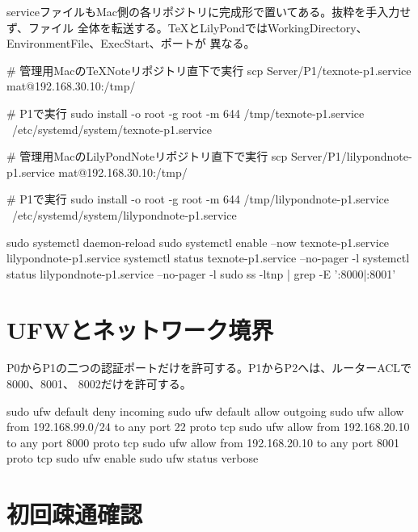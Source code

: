 \documentclass[uplatex,a4paper,11pt]{jsarticle}
\begin{document}
serviceファイルもMac側の各リポジトリに完成形で置いてある。抜粋を手入力せず、ファイル
全体を転送する。TeXとLilyPondではWorkingDirectory、EnvironmentFile、ExecStart、ポートが
異なる。





\begin{command}
# 管理用MacのTeXNoteリポジトリ直下で実行
scp Server/P1/texnote-p1.service mat@192.168.30.10:/tmp/

# P1で実行
sudo install -o root -g root -m 644 /tmp/texnote-p1.service \
  /etc/systemd/system/texnote-p1.service

# 管理用MacのLilyPondNoteリポジトリ直下で実行
scp Server/P1/lilypondnote-p1.service mat@192.168.30.10:/tmp/

# P1で実行
sudo install -o root -g root -m 644 /tmp/lilypondnote-p1.service \
  /etc/systemd/system/lilypondnote-p1.service
\end{command}

\begin{command}
sudo systemctl daemon-reload
sudo systemctl enable --now texnote-p1.service lilypondnote-p1.service
systemctl status texnote-p1.service --no-pager -l
systemctl status lilypondnote-p1.service --no-pager -l
sudo ss -ltnp | grep -E ':8000|:8001'
\end{command}

\section{UFWとネットワーク境界}

P0からP1の二つの認証ポートだけを許可する。P1からP2へは、ルーターACLで8000、8001、
8002だけを許可する。

\begin{command}
sudo ufw default deny incoming
sudo ufw default allow outgoing
sudo ufw allow from 192.168.99.0/24 to any port 22 proto tcp
sudo ufw allow from 192.168.20.10 to any port 8000 proto tcp
sudo ufw allow from 192.168.20.10 to any port 8001 proto tcp
sudo ufw enable
sudo ufw status verbose
\end{command}

\section{初回疎通確認}
\end{document}
